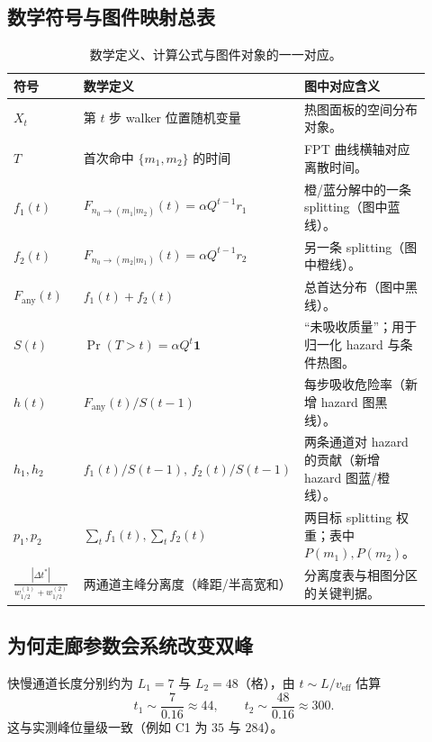 \documentclass[11pt,fontset=fandol]{ctexart}
\begin{document}
\subsection{数学符号与图件映射总表}
\begin{table}[!htbp]
  \centering
  \footnotesize
  \begin{tabular}{p{0.19\linewidth}p{0.30\linewidth}p{0.43\linewidth}}
    \toprule
    符号 & 数学定义 & 图中对应含义 \\
    \midrule
    $X_t$ & 第 $t$ 步 walker 位置随机变量 & 热图面板的空间分布对象。 \\
    $T$ & 首次命中 $\{m_1,m_2\}$ 的时间 & FPT 曲线横轴对应离散时间。 \\
    $f_1(t)$ & $F_{n_0\to(m_1|m_2)}(t)=\alpha Q^{t-1}r_1$ & 橙/蓝分解中的一条 splitting（图中蓝线）。 \\
    $f_2(t)$ & $F_{n_0\to(m_2|m_1)}(t)=\alpha Q^{t-1}r_2$ & 另一条 splitting（图中橙线）。 \\
    $F_{\mathrm{any}}(t)$ & $f_1(t)+f_2(t)$ & 总首达分布（图中黑线）。 \\
    $S(t)$ & $\Pr(T>t)=\alpha Q^t\mathbf 1$ & “未吸收质量”；用于归一化 hazard 与条件热图。 \\
    $h(t)$ & $F_{\mathrm{any}}(t)/S(t-1)$ & 每步吸收危险率（新增 hazard 图黑线）。 \\
    $h_1,h_2$ & $f_1(t)/S(t-1),\,f_2(t)/S(t-1)$ & 两条通道对 hazard 的贡献（新增 hazard 图蓝/橙线）。 \\
    $p_1,p_2$ & $\sum_t f_1(t),\sum_t f_2(t)$ & 两目标 splitting 权重；表中 $P(m_1),P(m_2)$。 \\
    $\frac{|\Delta t^*|}{w_{1/2}^{(1)}+w_{1/2}^{(2)}}$ & 两通道主峰分离度（峰距/半高宽和） & 分离度表与相图分区的关键判据。 \\
    \bottomrule
  \end{tabular}
  \caption{数学定义、计算公式与图件对象的一一对应。}
  \label{tab:math-map}
\end{table}

\subsection{为何走廊参数会系统改变双峰}
快慢通道长度分别约为 $L_1=7$ 与 $L_2=48$（格），由 $t\sim L/v_{\mathrm{eff}}$ 估算
\begin{equation}
t_1\sim\frac{7}{0.16}\approx44,\qquad t_2\sim\frac{48}{0.16}\approx300.
\end{equation}
这与实测峰位量级一致（例如 C1 为 $35$ 与 $284$）。
\end{document}
